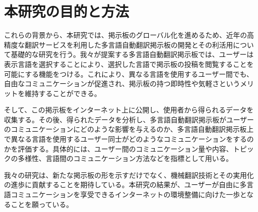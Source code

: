 \documentclass[b5paper,12pt]{jsreport}
\begin{document}
\section{本研究の目的と方法}

これらの背景から、本研究では、掲示板のグローバル化を進めるため、近年の高精度な翻訳サービスを利用した多言語自動翻訳掲示板の開発とその利活用について基礎的な研究を行う。我々が提案する多言語自動翻訳掲示板では、ユーザーは表示言語を選択することにより、選択した言語で掲示板の投稿を閲覧することを可能にする機能をつける。これにより、異なる言語を使用するユーザー間でも、自由なコミュニケーションが促進され、掲示板の持つ即時性や気軽さというメリットを維持することができる。

そして、この掲示板をインターネット上に公開し、使用者から得られるデータを収集する。その後、得られたデータを分析し、多言語自動翻訳掲示板がユーザーのコミュニケーションにどのような影響を与えるのか、多言語自動翻訳掲示板上で異なる言語を使用するユーザー同士がどのようなコミュニケーションをするのかを評価する。具体的には、ユーザー間のコミュニケーション量や内容、トピックの多様性、言語間のコミュニケーション方法などを指標として用いる。

我々の研究は、新たな掲示板の形を示すだけでなく、機械翻訳技術とその実用化の進歩に貢献することを期待している。本研究の結果が、ユーザーが自由に多言語コミュニケーションを享受できるインターネットの環境整備に向けた一歩となることを願っている。









\end{document}
